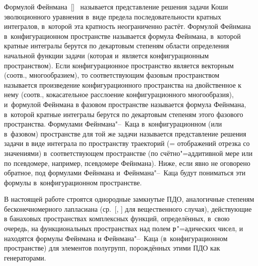 Формулой Фейнмана~[]\ %
называется представление решения задачи Коши эволюционного уравнения  в~виде предела последовательности кратных интегралов, в~которой эта кратность неограниченно растёт.
Формулой Фейнмана в~конфигурационном пространстве называется формула Фейнмана, в~которой кратные интегралы берутся по декартовым степеням области определения начальной функции  задачи (которая и~является конфигурационным пространством).
Если конфигурационное пространство является векторным (соотв., многообразием), то соответствующим фазовым пространством называется  произведение конфигурационного пространства на двойственное к~ нему (соотв., кокасательное расслоение конфигурационного многообразия),
 и~формулой Фейнмана в фазовом пространстве  называется формула Фейнмана, в~которой кратные интегралы берутся по декартовым степеням этого фазового пространства.
 Формулами Фейнмана"--~Каца в~конфигурационном (или в~фазовом) пространстве для той же задачи называется представление  решения задачи в виде интеграла по пространству траекторий (= отображений отрезка  со значениями)  в~соответствующем пространстве (по счётно"=аддитивной мере или по псевдомере, например, псевдомере Фейнмана).
 Ниже, если явно не оговорено обратное, под формулами Фейнмана и~Фейнмана"--~Каца будут пониматься эти формулы в~конфигурационном пространстве.

 В настоящей работе строятся однородные замкнутые ПДО,	 аналогичные степеням бесконечномерного лапласиана  (ср.~[, ]  %
  для вещественного случая),  действующие в банаховых пространствах комплексных функций,  определённых, в~свою очередь, на функциональных пространствах 
 над полем \linebreak ${\mathfrak p}$"=адических чисел,  и находятся формулы Фейнмана и Фейнмана"--~Каца  (в~конфигурационном пространстве)  для элементов полугрупп,
 порождённых этими ПДО как генераторами.


